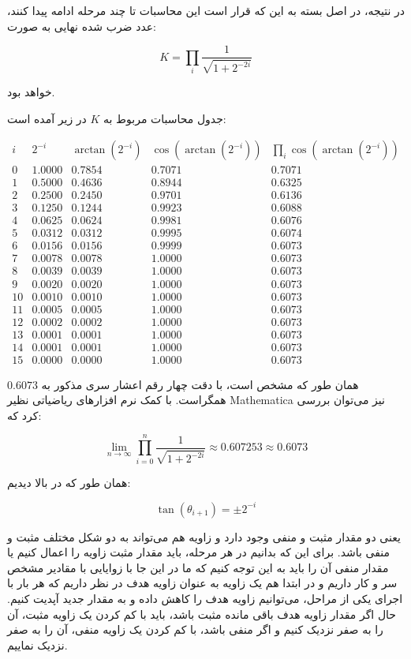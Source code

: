 \documentclass[12pt,titlepage,a4page , tikz , multi,table , svgnames,xcdraw]{article}
\begin{document}
در نتیجه، در اصل بسته به این که قرار است این محاسبات تا چند مرحله ادامه پیدا کنند، عدد ضرب شده نهایی به صورت:

$$K = \prod_{i} \frac{1}{\sqrt{1 + 2^{-2i}}}$$

خواهد بود.


جدول محاسبات مربوط به $K$ در زیر آمده است:

$$\begin{array}{c|c|c|c|c}
{i} & {2^{-i}} & {\arctan(2^{-i})} & {\cos(\arctan(2^{-i}))} & \prod_{i} \cos(\arctan(2^{-i})) \\
 0 &  1.0000 &  0.7854 &  0.7071 &  0.7071\\
  1 &  0.5000 &  0.4636 &  0.8944 &  0.6325\\
  2 &  0.2500 &  0.2450 &  0.9701 &  0.6136\\
  3 &  0.1250 &  0.1244 &  0.9923 &  0.6088\\
  4 &  0.0625 &  0.0624 &  0.9981 &  0.6076\\
  5 &  0.0312 &  0.0312 &  0.9995 &  0.6074\\
  6 &  0.0156 &  0.0156 &  0.9999 &  0.6073\\
  7 &  0.0078 &  0.0078 &  1.0000 &  0.6073\\
  8 &  0.0039 &  0.0039 &  1.0000 &  0.6073\\
  9 &  0.0020 &  0.0020 &  1.0000 &  0.6073\\
  10 &  0.0010 &  0.0010 &  1.0000 &  0.6073\\
  11 &  0.0005 &  0.0005 &  1.0000 &  0.6073\\
  12 &  0.0002 &  0.0002 &  1.0000 &  0.6073\\
  13 &  0.0001 &  0.0001 &  1.0000 &  0.6073\\
  14 &  0.0001 &  0.0001 &  1.0000 &  0.6073\\
  15 &  0.0000 &  0.0000 &  1.0000 &  0.6073

\end{array}$$

همان طور که مشخص است، با دقت چهار رقم اعشار سری مذکور به $0.6073$ همگراست. با کمک نرم افزارهای ریاضیاتی نظیر Mathematica نیز می‌توان بررسی کرد که:

$$\lim_{n \to \infty}  \prod_{i=0}^{n} \frac{1}{\sqrt{1 + 2^{-2i}}} \approx 0.607253 \approx 0.6073$$

همان طور که در بالا دیدیم:

$$\tan (\theta_{i+1}) = \pm 2^{-i}$$

یعنی دو مقدار مثبت و منفی وجود دارد و زاویه هم می‌تواند به دو شکل مختلف مثبت و منفی باشد. برای این که بدانیم در هر مرحله، باید مقدار مثبت زاویه را اعمال کنیم یا مقدار منفی آن را باید به این توجه کنیم که ما در این جا با زوایایی با مقادیر مشخص سر و کار داریم و در ابتدا هم یک زاویه به عنوان زاویه هدف در نظر داریم که هر بار با اجرای یکی از مراحل، می‌توانیم زاویه هدف را کاهش داده و به مقدار جدید آپدیت کنیم. حال اگر مقدار زاویه هدف باقی مانده مثبت باشد، باید با کم کردن یک زاویه مثبت، آن را به صفر نزدیک کنیم و اگر منفی باشد، با کم کردن یک زاویه منفی، آن را به صفر نزدیک نماییم.
\end{document}
